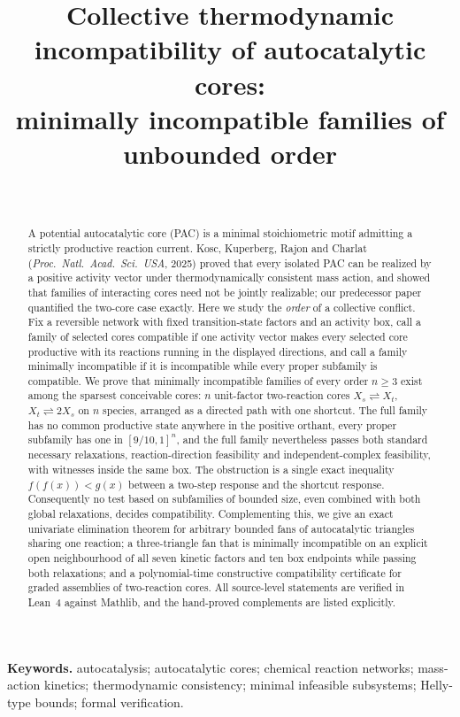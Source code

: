 \documentclass[11pt,a4paper]{article}
\title{Collective thermodynamic incompatibility of autocatalytic cores:\\ minimally incompatible families of unbounded order}
\author{\PaperAuthor\\ \PaperAffiliation}
\date{\PaperDate}
\theoremstyle{plain}
\theoremstyle{definition}
\theoremstyle{remark}
\newcommand{\rev}{\rightleftharpoons}
\begin{document}
\maketitle

\begin{abstract}
A potential autocatalytic core (PAC) is a minimal stoichiometric motif admitting a strictly productive reaction current. Kosc, Kuperberg, Rajon and Charlat (\emph{Proc.\ Natl.\ Acad.\ Sci.\ USA}, 2025) proved that every isolated PAC can be realized by a positive activity vector under thermodynamically consistent mass action, and showed that families of interacting cores need not be jointly realizable; our predecessor paper quantified the two-core case exactly. Here we study the \emph{order} of a collective conflict. Fix a reversible network with fixed transition-state factors and an activity box, call a family of selected cores compatible if one activity vector makes every selected core productive with its reactions running in the displayed directions, and call a family minimally incompatible if it is incompatible while every proper subfamily is compatible. We prove that minimally incompatible families of every order $n\ge 3$ exist among the sparsest conceivable cores: $n$ unit-factor two-reaction cores $X_s\rev X_t$, $X_t\rev 2X_s$ on $n$ species, arranged as a directed path with one shortcut. The full family has no common productive state anywhere in the positive orthant, every proper subfamily has one in $[9/10,1]^n$, and the full family nevertheless passes both standard necessary relaxations, reaction-direction feasibility and independent-complex feasibility, with witnesses inside the same box. The obstruction is a single exact inequality $f(f(x))<g(x)$ between a two-step response and the shortcut response. Consequently no test based on subfamilies of bounded size, even combined with both global relaxations, decides compatibility. Complementing this, we give an exact univariate elimination theorem for arbitrary bounded fans of autocatalytic triangles sharing one reaction; a three-triangle fan that is minimally incompatible on an explicit open neighbourhood of all seven kinetic factors and ten box endpoints while passing both relaxations; and a polynomial-time constructive compatibility certificate for graded assemblies of two-reaction cores. All source-level statements are verified in Lean~4 against Mathlib, and the hand-proved complements are listed explicitly.
\end{abstract}

\noindent\textbf{Keywords.} autocatalysis; autocatalytic cores; chemical reaction networks; mass-action kinetics; thermodynamic consistency; minimal infeasible subsystems; Helly-type bounds; formal verification.
\end{document}

